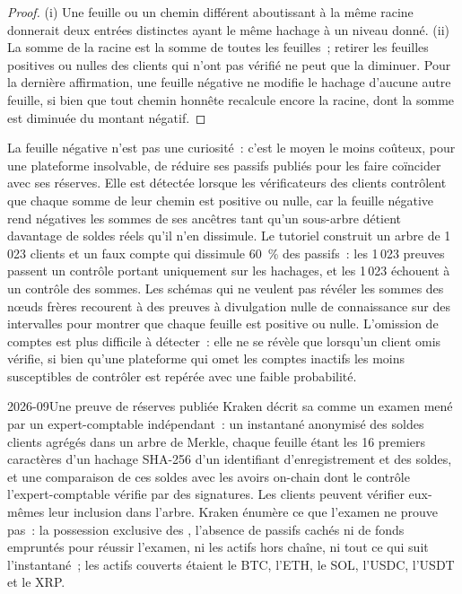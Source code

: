 \begin{proof}
(i) Une feuille ou un chemin différent aboutissant à la même racine donnerait deux entrées distinctes ayant le même hachage à
un niveau donné. (ii) La somme de la racine est la somme de toutes les feuilles~; retirer les feuilles positives ou nulles des clients
qui n'ont pas vérifié ne peut que la diminuer. Pour la dernière affirmation, une feuille négative ne modifie le hachage d'aucune autre feuille, si bien
que tout chemin honnête recalcule encore la racine, dont la somme est diminuée du montant négatif.
\end{proof}

La feuille négative n'est pas une curiosité~: c'est le moyen le moins coûteux, pour une plateforme insolvable, de réduire ses
passifs publiés pour les faire coïncider avec ses réserves. Elle est détectée lorsque les vérificateurs des clients contrôlent que chaque somme
de leur chemin est positive ou nulle, car la feuille négative rend négatives les sommes de ses ancêtres tant qu'un sous-arbre
détient davantage de soldes réels qu'il n'en dissimule. Le tutoriel construit un arbre de 1\,023 clients et un faux
compte qui dissimule 60~\% des passifs~: les 1\,023 preuves passent un contrôle portant uniquement sur les hachages, et les 1\,023 échouent
à un contrôle des sommes. Les schémas qui ne veulent pas révéler les sommes des nœuds frères recourent à des preuves à divulgation nulle de connaissance sur des intervalles pour montrer
que chaque feuille est positive ou nulle. L'omission de comptes est plus difficile à détecter~: elle ne se révèle que lorsqu'un client omis
vérifie, si bien qu'une plateforme qui omet les comptes inactifs les moins susceptibles de contrôler est repérée avec une faible
probabilité.

\begin{dated}{2026-09}{Une preuve de réserves publiée}\label{dat:m3:centralised-exchanges:kraken}
Kraken décrit sa  comme un examen mené par un expert-comptable indépendant~: un instantané anonymisé des
soldes clients agrégés dans un arbre de Merkle, chaque feuille étant les 16 premiers caractères d'un hachage SHA-256 d'un identifiant
d'enregistrement et des soldes, et une comparaison de ces soldes avec les avoirs on-chain dont le contrôle
l'expert-comptable vérifie par des signatures. Les clients peuvent vérifier eux-mêmes leur inclusion dans l'arbre. Kraken énumère
ce que l'examen ne prouve pas~: la possession exclusive des , l'absence de passifs cachés
ni de fonds empruntés pour réussir l'examen, ni les actifs hors chaîne, ni tout ce qui suit l'instantané~; les actifs
couverts étaient le BTC, l'ETH, le SOL, l'USDC, l'USDT et le XRP.
\end{dated}

